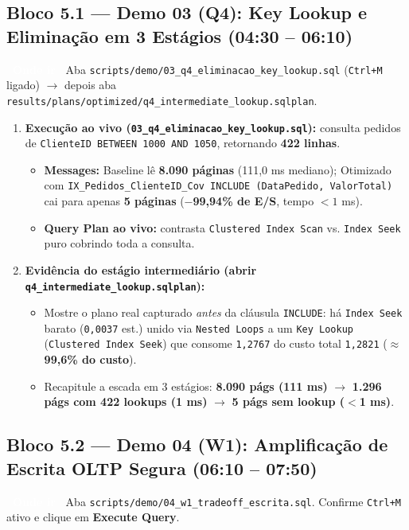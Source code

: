 \documentclass[10pt,a4paper]{article}
\newcommand{\tagAction}[1]{\colorbox{InfoBlue}{\textcolor{white}{\textbf{\footnotesize\ #1\ }}}}
\begin{document}
\subsection*{Bloco 5.1 — Demo 03 (Q4): Key Lookup e Eliminação em 3 Estágios (04:30 -- 06:10)}
\tagAction{Onde ir} Aba \texttt{scripts/demo/03\_q4\_eliminacao\_key\_lookup.sql} (\texttt{Ctrl+M} ligado) $\rightarrow$ depois aba \texttt{results/plans/\allowbreak optimized/\allowbreak q4\_intermediate\_lookup.sqlplan}.

\begin{enumerate}[leftmargin=16pt,itemsep=2pt,topsep=2pt]
  \item \textbf{Execução ao vivo (\texttt{03\_q4\_eliminacao\_key\_lookup.sql}):} consulta pedidos de \texttt{ClienteID BETWEEN 1000 AND 1050}, retornando \textbf{422 linhas}.
  \begin{itemize}[leftmargin=14pt,itemsep=1pt,topsep=1pt]
    \item \textbf{Messages:} Baseline lê \textbf{8.090 páginas} (111,0 ms mediano); Otimizado com \texttt{IX\_Pedidos\_\allowbreak ClienteID\_Cov INCLUDE (DataPedido, ValorTotal)} cai para apenas \textbf{5 páginas} (\textbf{$-$99,94\% de E/S}, tempo $<1$ ms).
    \item \textbf{Query Plan ao vivo:} contrasta \texttt{Clustered Index Scan} vs. \texttt{Index Seek} puro cobrindo toda a consulta.
  \end{itemize}
  \item \textbf{Evidência do estágio intermediário (abrir \texttt{q4\_intermediate\_lookup.sqlplan}):}
  \begin{itemize}[leftmargin=14pt,itemsep=1pt,topsep=1pt]
    \item Mostre o plano real capturado \emph{antes} da cláusula \texttt{INCLUDE}: há \texttt{Index Seek} barato (\texttt{0,0037} est.) unido via \texttt{Nested Loops} a um \texttt{Key Lookup} (\texttt{Clustered Index Seek}) que consome \texttt{1,2767} do custo total \texttt{1,2821} (\textbf{$\approx$99,6\% do custo}).
    \item Recapitule a escada em 3 estágios: \textbf{8.090 págs (111 ms)} $\rightarrow$ \textbf{1.296 págs com 422 lookups (1 ms)} $\rightarrow$ \textbf{5 págs sem lookup ($<$1 ms)}.
  \end{itemize}
\end{enumerate}

\subsection*{Bloco 5.2 — Demo 04 (W1): Amplificação de Escrita OLTP Segura (06:10 -- 07:50)}
\tagAction{Onde ir} Aba \texttt{scripts/demo/04\_w1\_tradeoff\_escrita.sql}. Confirme \texttt{Ctrl+M} ativo e clique em \textbf{Execute Query}.
\end{document}
